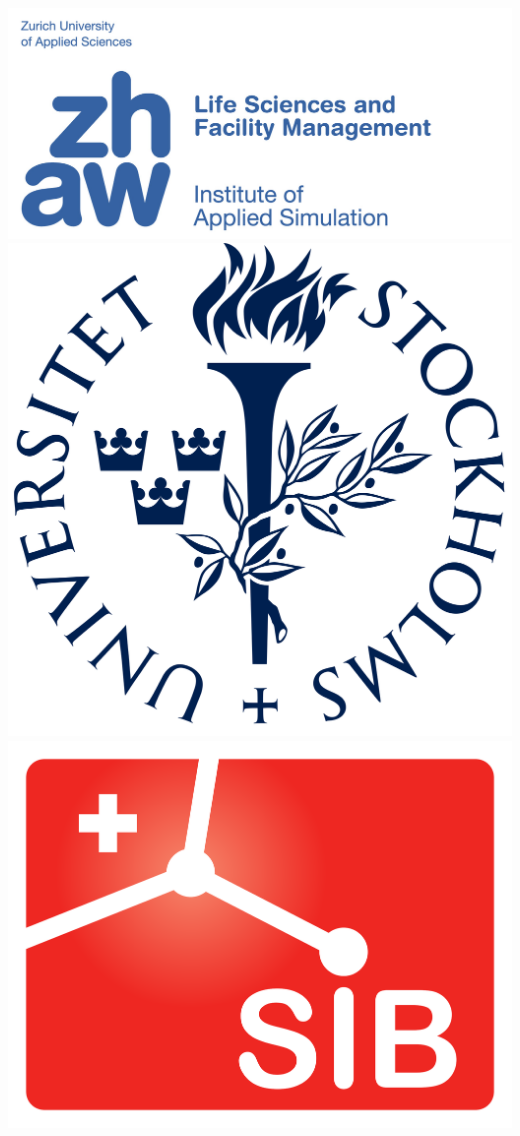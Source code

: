 \documentclass[a0paper,fleqn]{betterposter}
\begin{document}
{{%
\begin{minipage}[t]{\textwidth}
    \begin{center}
    \includegraphics[width=0.1\paperwidth]{img/zhaw_lsfm_ias_blau_en.jpg}
    \includegraphics[width=0.05\paperwidth]{img/logo_SU.png}
    \includegraphics[width=0.06\paperwidth]{img/logo_sib.png}    
    \end{center}
    

\end{minipage}}}
\end{document}
